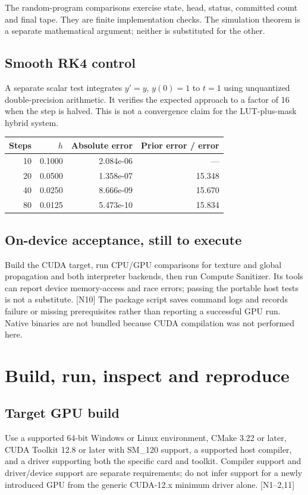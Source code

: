 \documentclass[11pt,a4paper]{article}
\newcommand{\ext}[1]{\textcolor{muted}{[N#1]}}
\begin{document}
The random-program comparisons exercise state, head, status, committed count and final tape. They are finite implementation checks. The simulation theorem is a separate mathematical argument; neither is substituted for the other.

\subsection{Smooth RK4 control}
A separate scalar test integrates $y'=y$, $y(0)=1$ to $t=1$ using unquantized double-precision arithmetic. It verifies the expected approach to a factor of 16 when the step is halved. This is not a convergence claim for the LUT-plus-mask hybrid system.

\begin{center}\small
\begin{tabular}{rrrr}\toprule
\textbf{Steps} & \textbf{$h$} & \textbf{Absolute error} & \textbf{Prior error / error}\\\midrule
10 & 0.1000 & 2.084e-06 & --- \\
20 & 0.0500 & 1.358e-07 & 15.348 \\
40 & 0.0250 & 8.666e-09 & 15.670 \\
80 & 0.0125 & 5.473e-10 & 15.834 \\
\bottomrule\end{tabular}\end{center}

\subsection{On-device acceptance, still to execute}
Build the CUDA target, run CPU/GPU comparisons for texture and global propagation and both interpreter backends, then run Compute Sanitizer. Its tools can report device memory-access and race errors; passing the portable host tests is not a substitute. \ext{10} The package script saves command logs and records failure or missing prerequisites rather than reporting a successful GPU run. Native binaries are not bundled because CUDA compilation was not performed here.
\clearpage

\section{Build, run, inspect and reproduce}\label{sec:build}
\subsection{Target GPU build}
Use a supported 64-bit Windows or Linux environment, CMake 3.22 or later, CUDA Toolkit 12.8 or later with SM\_120 support, a supported host compiler, and a driver supporting both the specific card and toolkit. Compiler support and driver/device support are separate requirements; do not infer support for a newly introduced GPU from the generic CUDA-12.x minimum driver alone. \ext{1--2,11}
\end{document}
